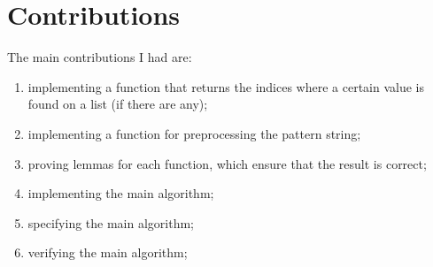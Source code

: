 \chapter*{Contributions} 

The main contributions I had are:
\begin{enumerate}
\item implementing a function that returns the indices where a certain value is found on a list (if there are any);
\item implementing a function for preprocessing the pattern string;
\item proving lemmas for each function, which ensure that the result is correct;
\item implementing the main algorithm;
\item specifying the main algorithm;
\item verifying the main algorithm;
\end{enumerate}